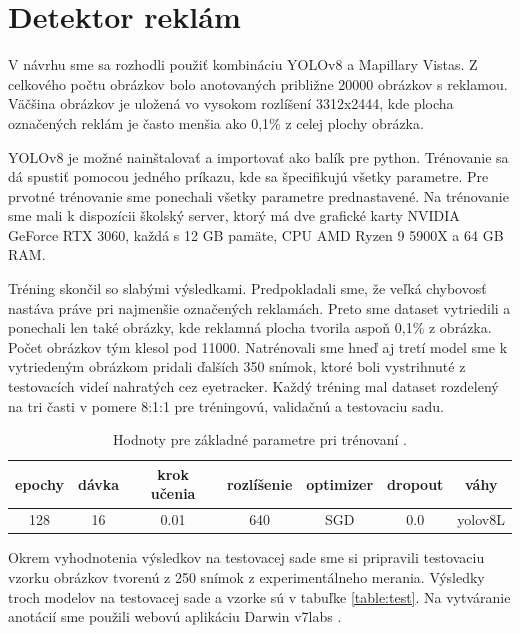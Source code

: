 
\section{Detektor reklám}

V návrhu sme sa rozhodli použiť kombináciu YOLOv8 a Mapillary Vistas. Z celkového počtu obrázkov bolo anotovaných približne 20000 obrázkov s reklamou. Väčšina obrázkov je uložená vo vysokom rozlíšení 3312x2444, kde plocha označených reklám je často menšia ako 0,1\% z celej plochy obrázka. 


YOLOv8 je možné nainštalovať a importovať ako balík pre python. Trénovanie sa dá spustiť pomocou jedného príkazu, kde sa špecifikujú všetky parametre. Pre prvotné trénovanie sme ponechali všetky parametre prednastavené. Na trénovanie sme mali k dispozícii školský server, ktorý má dve grafické karty NVIDIA GeForce RTX 3060, každá s 12 GB pamäte, CPU AMD Ryzen 9 5900X a 64 GB RAM.


Tréning skončil so slabými výsledkami. Predpokladali sme, že veľká chybovosť nastáva práve pri najmenšie označených reklamách. Preto sme dataset vytriedili a ponechali len také obrázky, kde reklamná plocha tvorila aspoň 0,1\% z obrázka. Počet obrázkov tým klesol pod 11000. Natrénovali sme hneď aj tretí model sme k vytriedeným obrázkom pridali ďalších 350 snímok, ktoré boli vystrihnuté z testovacích videí nahratých cez eyetracker. Každý tréning mal dataset rozdelený na tri časti v pomere 8:1:1 pre tréningovú, validačnú a testovaciu sadu.

\begin{table}
\centering
\begin{tabular}{ |c c c c c c c|  }
\hline
epochy & dávka & krok učenia & rozlíšenie & optimizer & dropout & váhy \\
\hline
128	  	& 16	& 0.01	& 640 & SGD & 0.0 & yolov8L \\
\hline
\end{tabular}
\caption{Hodnoty pre základné parametre pri trénovaní .}
\label{table:1}
\end{table}

Okrem vyhodnotenia výsledkov na testovacej sade sme si pripravili testovaciu vzorku obrázkov tvorenú z 250 snímok z experimentálneho merania. Výsledky troch modelov na testovacej sade a vzorke sú v tabuľke \ref{table:test}. Na vytváranie anotácií sme použili webovú aplikáciu Darwin v7labs \cite{v7}.

